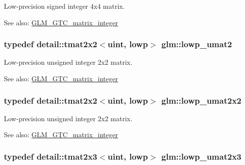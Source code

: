 Low-precision signed integer 4x4 matrix. \begin{Desc}
\item[See also:]\hyperlink{group__gtc__matrix__integer}{GLM\_\-GTC\_\-matrix\_\-integer} \end{Desc}
\hypertarget{group__gtc__matrix__integer_g09df85e6b5e53f66a86d042e0633bfbc}{
\subsubsection[lowp\_\-umat2]{\setlength{\rightskip}{0pt plus 5cm}typedef detail::tmat2x2$<$uint, lowp$>$ {\bf glm::lowp\_\-umat2}}}
\label{group__gtc__matrix__integer_g09df85e6b5e53f66a86d042e0633bfbc}


Low-precision unsigned integer 2x2 matrix. \begin{Desc}
\item[See also:]\hyperlink{group__gtc__matrix__integer}{GLM\_\-GTC\_\-matrix\_\-integer} \end{Desc}
\hypertarget{group__gtc__matrix__integer_ga4dfe67706187e459004b9a6c500b048}{
\subsubsection[lowp\_\-umat2x2]{\setlength{\rightskip}{0pt plus 5cm}typedef detail::tmat2x2$<$uint, lowp$>$ {\bf glm::lowp\_\-umat2x2}}}
\label{group__gtc__matrix__integer_ga4dfe67706187e459004b9a6c500b048}


Low-precision unsigned integer 2x2 matrix. \begin{Desc}
\item[See also:]\hyperlink{group__gtc__matrix__integer}{GLM\_\-GTC\_\-matrix\_\-integer} \end{Desc}
\hypertarget{group__gtc__matrix__integer_g4c8388c4a03f228c0e12dd7b7445115d}{
\subsubsection[lowp\_\-umat2x3]{\setlength{\rightskip}{0pt plus 5cm}typedef detail::tmat2x3$<$uint, lowp$>$ {\bf glm::lowp\_\-umat2x3}}}
\label{group__gtc__matrix__integer_g4c8388c4a03f228c0e12dd7b7445115d}


